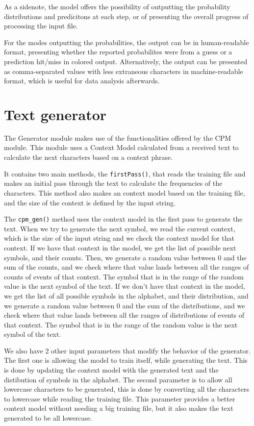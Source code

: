 \documentclass{article}
\begin{document}
As a sidenote, the model offers the possibility of outputting the probability distributions and predicitons at each step, or of presenting the overall progress of processing the input file.

For the modes outputting the probabilities, the output can be in human-readable format, presenting whether the reported probabilites were from a guess or a prediction hit/miss in colored output.
Alternatively, the output can be presented as comma-separated values with less extraneous characters in machine-readable format, which is useful for data analysis afterwards.


\section{Text generator}
\label{sec:text-generator}

The Generator module makes use of the functionalities offered by the CPM module.
This module uses a Context Model calculated from a received text to calculate the
next characters based on a context phrase. 

It contains two main methods, the \verb|firstPass()|, that reads the training file and makes an initial pass through the text to calculate the frequencies of the characters.
This method also makes an context model based on the training file, and the size of the context is defined by the input string. 

The \verb|cpm_gen()| method uses the context model in the first pass to generate the text.
When we try to generate the next symbol, we read the current context, which is the size of the input string and we check the context model for that context. If we have that context in the model, we get the list of possible next symbols, and their counts. Then, we generate a random value between 0 and the sum of the counts, and we check where that value lands between all the ranges of counts of events of that context. The symbol that is in the range of the random value is the next symbol of the text.
If we don't have that context in the model, we get the list of all possible symbols in the alphabet, and their distribution, and we generate a random value between 0 and the sum of the distributions, and we check where that value lands between all the ranges of distributions of events of that context. The symbol that is in the range of the random value is the next symbol of the text. 

We also have 2 other input parameters that modify the behavior of the generator. The first one is allowing the model to train itself, while generating the text. This is done by updating the context model with the generated text and the distibution of symbols in the alphabet.
The second parameter is to allow all lowercase characters to be generated, this is done by converting all the characters to lowercase while reading the training file. This parameter provides a better context model without needing a big training file, but it also makes the text generated to be all lowercase.
\end{document}
